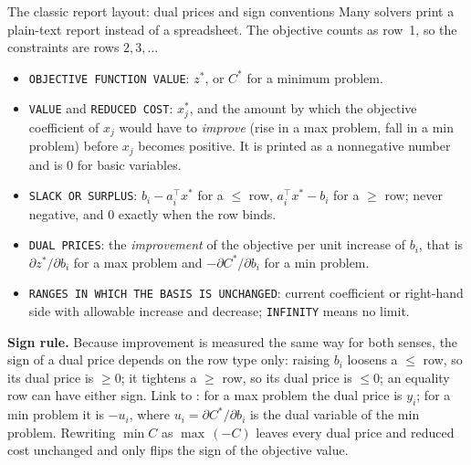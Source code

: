 \begin{rulebox}{The classic report layout: dual prices and sign conventions}
Many solvers print a plain-text report instead of a spreadsheet. The
objective counts as row~1, so the constraints are rows $2,3,\dots$
\begin{itemize}[leftmargin=1.6em,itemsep=0.3ex]
  \item \texttt{OBJECTIVE FUNCTION VALUE}: $z^{*}$, or $C^{*}$ for a
        minimum problem.
  \item \texttt{VALUE} and \texttt{REDUCED COST}: $x_{j}^{*}$, and the
        amount by which the objective coefficient of $x_{j}$ would have to
        \emph{improve} (rise in a max problem, fall in a min problem)
        before $x_{j}$ becomes positive. It is printed as a nonnegative
        number and is $0$ for basic variables.
  \item \texttt{SLACK OR SURPLUS}: $b_{i}-a_{i}^{\top}x^{*}$ for a $\le$
        row, $a_{i}^{\top}x^{*}-b_{i}$ for a $\ge$ row; never negative, and
        $0$ exactly when the row binds.
  \item \texttt{DUAL PRICES}: the \emph{improvement} of the objective per
        unit increase of $b_{i}$, that is $\partial z^{*}/\partial b_{i}$
        for a max problem and $-\partial C^{*}/\partial b_{i}$ for a min
        problem.
  \item \texttt{RANGES IN WHICH THE BASIS IS UNCHANGED}: current
        coefficient or right-hand side with allowable increase and
        decrease; \texttt{INFINITY} means no limit.
\end{itemize}
\textbf{Sign rule.} Because improvement is measured the same way for both
senses, the sign of a dual price depends on the row type only: raising
$b_{i}$ loosens a $\le$ row, so its dual price is $\ge 0$; it tightens a
$\ge$ row, so its dual price is $\le 0$; an equality row can have either
sign. Link to : for a max problem the dual price is $y_{i}$; for
a min problem it is $-u_{i}$, where $u_{i}=\partial C^{*}/\partial b_{i}$
is the dual variable of the min problem. Rewriting $\min C$ as
$\max\,(-C)$ leaves every dual price and reduced cost unchanged and only
flips the sign of the objective value.
\end{rulebox}

